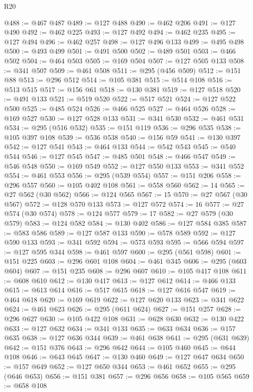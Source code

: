 \begin{lexlean}{R20}
\begin{coremodule}
@488 := @467 @487
@489 := @127 @488
@490 := @462 @206
@491 := @127 @490
@492 := @462 @225
@493 := @127 @492
@494 := @462 @235
@495 := @127 @494
@496 := @462 @257
@498 := @127 @496 @133
@499 := @495 @498
@500 := @493 @499
@501 := @491 @500
@502 := @489 @501
@503 := @466 @502
@504 := @464 @503
@505 := @169 @504
@507 := @127 @505 @133
@508 := @341 @507
@509 := @461 @508
@511 := @295 (@456 @509)
@512 := @151 @88
@513 := @296 @512
@514 := @105 @381
@515 := @514 @108
@516 := @513 @515
@517 := @156 @61
@518 := @130 @381
@519 := @127 @518
@520 := @491 @133
@521 := @519 @520
@522 := @517 @521
@524 := @127 @522 @500
@525 := @485 @524
@526 := @466 @525
@527 := @464 @526
@528 := @169 @527
@530 := @127 @528 @133
@531 := @341 @530
@532 := @461 @531
@534 := @295 (@516 @532)
@535 := @151 @119
@536 := @296 @535
@538 := @105 @397 @108
@539 := @536 @538
@540 := @156 @59
@541 := @130 @397
@542 := @127 @541
@543 := @464 @133
@544 := @542 @543
@545 := @540 @544
@546 := @127 @545
@547 := @485 @501
@548 := @466 @547
@549 := @546 @548
@550 := @169 @549
@552 := @127 @550 @133
@553 := @341 @552
@554 := @461 @553
@556 := @295 (@539 @554)
@557 := @151 @206
@558 := @296 @557
@560 := @105 @402 @108
@561 := @558 @560
@562 := 14
@565 := @27 @562 (@30 @562)
@566 := @124 @565
@567 := 15
@570 := @27 @567 (@30 @567)
@572 := @128 @570 @133
@573 := @127 @572
@574 := 16
@577 := @27 @574 (@30 @574)
@578 := @124 @577
@579 := 17
@582 := @27 @579 (@30 @579)
@583 := @124 @582
@584 := @130 @402
@586 := @127 @584 @385
@587 := @583 @586
@589 := @127 @587 @133
@590 := @578 @589
@592 := @127 @590 @133
@593 := @341 @592
@594 := @573 @593
@595 := @566 @594
@597 := @127 @595 @344
@598 := @461 @597
@600 := @295 (@561 @598)
@601 := @151 @225
@603 := @296 @601 @108
@604 := @461 @345
@606 := @295 (@603 @604)
@607 := @151 @235
@608 := @296 @607
@610 := @105 @417 @108
@611 := @608 @610
@612 := @130 @417
@613 := @127 @612
@614 := @466 @133
@615 := @613 @614
@616 := @517 @615
@618 := @127 @616 @547
@619 := @464 @618
@620 := @169 @619
@622 := @127 @620 @133
@623 := @341 @622
@624 := @461 @623
@626 := @295 (@611 @624)
@627 := @151 @257
@628 := @296 @627
@630 := @105 @422 @108
@631 := @628 @630
@632 := @130 @422
@633 := @127 @632
@634 := @341 @133
@635 := @633 @634
@636 := @157 @635
@638 := @127 @636 @344
@639 := @461 @638
@641 := @295 (@631 @639)
@642 := @151 @376
@643 := @296 @642
@644 := @105 @460
@645 := @644 @108
@646 := @643 @645
@647 := @130 @460
@649 := @127 @647 @634
@650 := @157 @649
@652 := @127 @650 @344
@653 := @461 @652
@655 := @295 (@646 @653)
@656 := @151 @381
@657 := @296 @656
@658 := @105 @565
@659 := @658 @108

\end{coremodule}
\end{lexlean}
